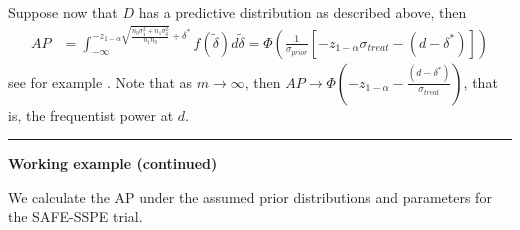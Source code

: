 \documentclass[
]{book}
\begin{document}
Suppose now that \(D\) has a predictive distribution as described above, then
\[
\begin{aligned}
AP&=\int_{-\infty}^{-z_{1-\alpha}\sqrt{\frac{n_0\sigma_1^2+n_1\sigma_0^2}{n_1n_0}}+\delta^*}f(\tilde\delta)d\tilde\delta= \Phi\left(\frac{1}{\sigma_{prior}}\left[-z_{1-\alpha}\sigma_{treat}-(d-\delta^*)\right]\right)
\end{aligned}
\]
see for example \citet{Grieve2022}. Note that as \(m \rightarrow \infty\), then \(AP \rightarrow \Phi\left(-z_{1-\alpha}-\frac{(d-\delta^*)}{\sigma_{treat}}\right)\), that is, the frequentist power at \(d\).

\begin{center}\rule{0.5\linewidth}{0.5pt}\end{center}

\textbf{Working example (continued) }

We calculate the AP under the assumed prior distributions and parameters for the SAFE-SSPE trial.
\end{document}
